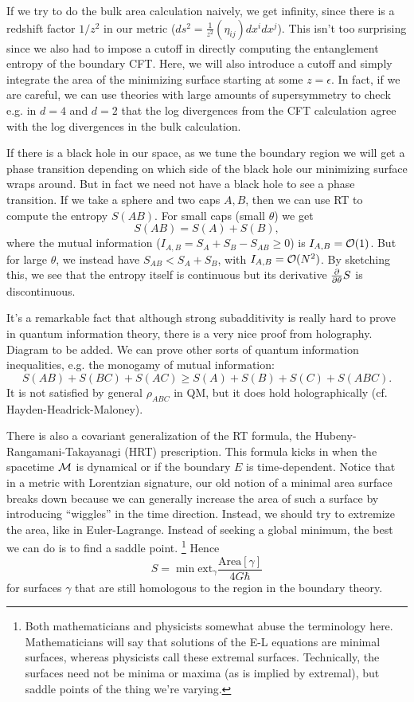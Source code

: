 If we try to do the bulk area calculation naively, we get infinity, since there is a redshift factor $1/z^2$ in our metric ($ds^2 =\frac{1}{z^2} (\eta_{ij})dx^i dx^j$). This isn't too surprising since we also had to impose a cutoff in directly computing the entanglement entropy of the boundary CFT. Here, we will also introduce a cutoff and simply integrate the area of the minimizing surface starting at some $z=\epsilon$. In fact, if we are careful, we can use theories with large amounts of supersymmetry to check e.g. in $d=4$ and $d=2$ that the log divergences from the CFT calculation agree with the log divergences in the bulk calculation.

If there is a black hole in our space, as we tune the boundary region we will get a phase transition depending on which side of the black hole our minimizing surface wraps around. But in fact we need not have a black hole to see a phase transition. If we take a sphere and two caps $A,B$, then we can use RT to compute the entropy $S(AB)$. For small caps (small $\theta$) we get
\begin{equation}
    S(AB)=S(A)+S(B),
\end{equation}
where the mutual information ($I_{A,B}=S_A+S_B-S_{AB}\geq 0$) is $I_{A,B}=\cO(1)$. But for large $\theta$, %
we instead have $S_{AB} < S_A + S_B$, with $I_{A,B} = \cO(N^2)$. By sketching this, we see that the entropy itself is continuous but its derivative $\P{}{\theta} S$ is discontinuous.

It's a remarkable fact that although strong subadditivity is really hard to prove in quantum information theory, there is a very nice proof from holography. Diagram to be added. We can prove other sorts of quantum information inequalities, e.g. the monogamy of mutual information:
\begin{equation}
    S(AB)+S(BC) +S(AC) \geq S(A) +S(B) +S(C) +S(ABC).
\end{equation}
It is not satisfied by general $\rho_{ABC}$ in QM, but it does hold holographically (cf. Hayden-Headrick-Maloney).

There is also a covariant generalization of the RT formula, the Hubeny-Rangamani-Takayanagi (HRT) prescription. This formula kicks in when the spacetime $\cM$ is dynamical or if the boundary $E$ is time-dependent. Notice that in a metric with Lorentzian signature, our old notion of a minimal area surface breaks down because we can generally increase the area of such a surface by introducing ``wiggles'' in the time direction. Instead, we should try to extremize the area, like in Euler-Lagrange. Instead of seeking a global minimum, the best we can do is to find a saddle point.%
    \footnote{Both mathematicians and physicists somewhat abuse the terminology here. Mathematicians will say that solutions of the E-L equations are minimal surfaces, whereas physicists call these extremal surfaces. Technically, the surfaces need not be minima or maxima (as is implied by extremal), but saddle points of the thing we're varying.
    }
Hence
\begin{equation}
    S=\min \text{ext}_\gamma \frac{\text{Area}[\gamma]}{4G\hbar}
\end{equation}
for surfaces $\gamma$ that are still homologous to the region in the boundary theory.

